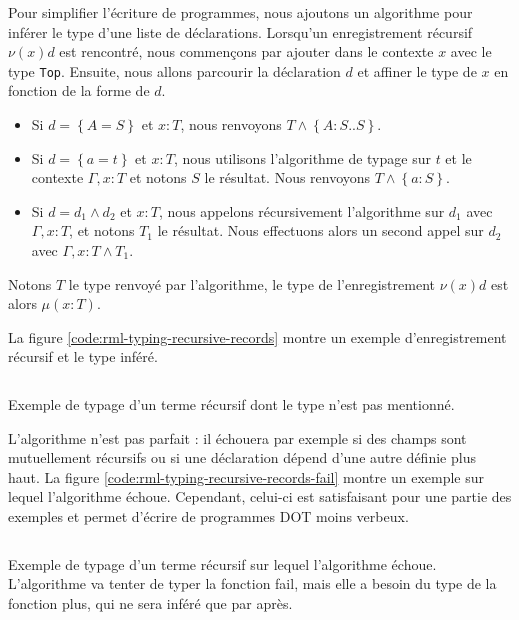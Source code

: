 Pour simplifier l'écriture de programmes, nous ajoutons un
algorithme pour inférer le type d'une liste de
déclarations. Lorsqu'un enregistrement récursif $\nu(x) d$ est rencontré,
nous commençons par ajouter dans le contexte $x$ avec le type \verb|Top|.
Ensuite, nous allons parcourir la déclaration $d$ et affiner le type de $x$ en
fonction de la forme de $d$.
\begin{itemize}
\item Si $d = \left\{ A = S \right\}$ et $x : T$, nous renvoyons $T \wedge
  \left\{ A : S .. S \right\}$.
\item Si $d = \left\{ a = t \right\}$ et $x : T$, nous utilisons l'algorithme de
  typage sur $t$ et le contexte $\Gamma, x : T$ et notons $S$ le résultat. Nous
  renvoyons $T \wedge \left\{ a : S \right\}$.
\item Si $d = d_{1} \wedge d_{2}$ et $x : T$, nous appelons récursivement
  l'algorithme sur $d_{1}$ avec $\Gamma, x : T$, et notons $T_{1}$ le résultat. Nous
  effectuons alors un second appel sur $d_{2}$ avec $\Gamma, x : T \wedge T_{1}$.
\end{itemize}
Notons $T$ le type renvoyé par l'algorithme, le type de l'enregistrement $\nu(x)
d$ est alors $\mu(x : T)$.

La figure \ref{code:rml-typing-recursive-records} montre un exemple
d'enregistrement récursif et le type inféré.

\begin{listing}
  \inputminted{OCaml}{codes/typing_recursive_records.rml}
  \caption{Exemple de typage d'un terme récursif dont le type n'est pas
    mentionné.}
  \label{code:rml-typing-recursive-records}
\end{listing}

L'algorithme n'est pas parfait : il échouera par exemple si des champs sont
mutuellement récursifs ou si une déclaration dépend d'une autre définie plus haut. La figure \ref{code:rml-typing-recursive-records-fail}
montre un exemple sur lequel l'algorithme échoue.
Cependant, celui-ci est satisfaisant pour une partie des exemples et permet
d'écrire de programmes DOT moins verbeux.

\begin{listing}
  \inputminted{OCaml}{codes/typing_recursive_records_fail.rml}
  \caption{Exemple de typage d'un terme récursif sur lequel l'algorithme échoue.
  L'algorithme va tenter de typer la fonction fail, mais elle a besoin du type
  de la fonction plus, qui ne sera inféré que par après.}
  \label{code:rml-typing-recursive-records-fail}
\end{listing}

